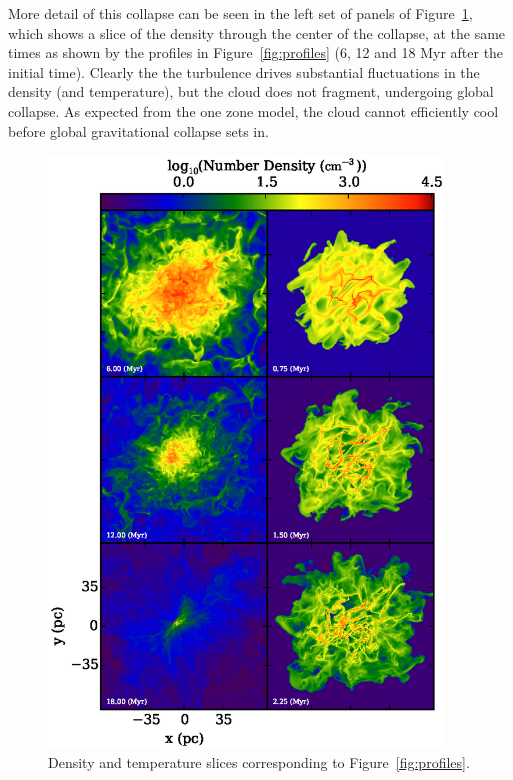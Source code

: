 \documentclass[useAMS,usenatbib]{mn2e}
\begin{document}
More detail of this collapse can be seen in the left set of panels of Figure~\ref{fig:number_density_panel},
which shows a slice of the density through the center of the collapse, at the same times as shown
by the profiles in Figure~\ref{fig:profiles} (6, 12 and 18 Myr after the initial time).  Clearly the the turbulence drives
substantial fluctuations in the density (and temperature), but the cloud does not fragment, undergoing
global collapse.   As expected from the one zone model, the cloud cannot efficiently
cool before global gravitational collapse sets in.

\begin{figure}
\begin{center}
\mbox{\includegraphics[width=10.5cm]{Images/slice_number_density_panel}}
\end{center}
\caption{\label{fig:number_density_panel} Density and temperature slices corresponding
to Figure~\ref{fig:profiles}.}
\end{figure}
\end{document}
